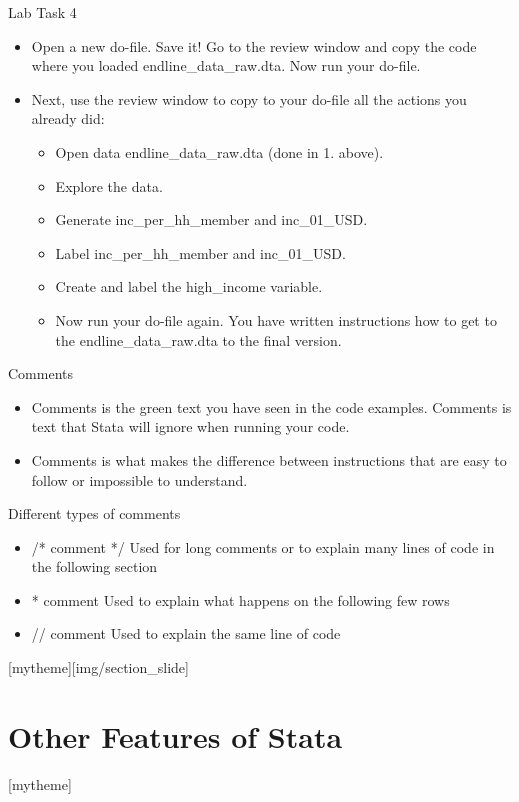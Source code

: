 \documentclass[aspectratio=169]{beamer}
\newcommand{\sectionpic}[2]{
	\setbeamertemplate{section page}[mytheme][#2]
	\section{#1}
	\setbeamertemplate{section page}[mytheme]
}
\begin{document}
\begin{frame}{Lab Task 4}
\begin{itemize}
	\item Open a new do-file. Save it! Go to the review window and copy the code where you loaded endline\_data\_raw.dta. Now run your do-file.
	\item Next, use the review window to copy to your do-file all the actions you already did:
		\begin{itemize}
			\item Open data endline\_data\_raw.dta (done in 1. above).
			\item Explore the data.
			\item Generate inc\_per\_hh\_member and inc\_01\_USD.
			\item Label inc\_per\_hh\_member and inc\_01\_USD.
			\item Create and label the high\_income variable.
			\item Now run your do-file again. You have written instructions how to get to the endline\_data\_raw.dta to the final version.
		\end{itemize}
\end{itemize}
\end{frame}

\begin{frame}{Comments}
\begin{itemize}
	\item Comments is the green text you have seen in the code examples. Comments is text that Stata will ignore when running your code.
	\item Comments is what makes the difference between instructions that are easy to follow or impossible to understand.
\end{itemize}
\end{frame}

\begin{frame}{Different types of comments}
\begin{itemize}
	\item /* comment */ Used for long comments or to explain many lines of code in the following section
	\item * comment Used to explain what happens on the following few rows
	\item // comment Used to explain the same line of code
\end{itemize}
\end{frame}

\sectionpic{Other Features of Stata}{img/section_slide}
\end{document}
